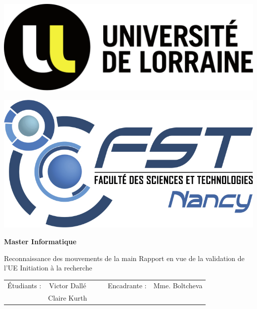\documentclass[11pt]{article}
\begin{document}
\begin{titlepage}
    \begin{center}

        \begin{minipage}[b]{0.3\textwidth}
        \includegraphics[width=\textwidth]{images/Logo_Universite_de_Lorraine.png}
        \end{minipage}
        \begin{minipage}[b]{0.2\textwidth}
            \centering
            \includegraphics[width=\textwidth]{images/logo-fst-format-jpg-couleur.jpg}
        \end{minipage}
        \smallbreak
        \vspace{0.5cm}
        \textbf{\large Master Informatique}

        \vfill
        {\Large Reconnaissance des mouvements de la main} \smallbreak
        Rapport \smallbreak en vue de la validation de l'UE Initiation à la recherche \smallbreak
        \vfill
        \begin{tabular}{ccc|ccc}
            \'Etudiants : & Victor Dallé & & & Encadrante : & Mme. Boltcheva \\
            & Claire Kurth & & & & 
            
        \end{tabular}
    \end{center}

\end{titlepage}
\end{document}

